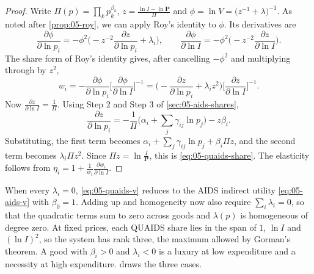 \begin{proof}
Write $\Pi(p) = \prod_kp_k^{\beta_k}$, $z = \frac{\ln I - \ln\mathbf{P}}{\Pi}$ and $\phi = \ln V =
\big(z^{-1} + \lambda\big)^{-1}$. As noted after \cref{prop:05-roy}, we can apply Roy's identity to
$\phi$. Its derivatives are
\begin{equation*}
\frac{\partial\phi}{\partial\ln p_i} = -\phi^2\Big(-z^{-2}\frac{\partial z}{\partial\ln p_i} + \lambda_i\Big),
\qquad
\frac{\partial\phi}{\partial\ln I} = -\phi^2\Big(-z^{-2}\frac{\partial z}{\partial\ln I}\Big).
\end{equation*}
The share form of Roy's identity gives, after cancelling $-\phi^2$ and multiplying through by $z^2$,
\begin{equation*}
w_i = -\frac{\partial\phi}{\partial\ln p_i}\Big[\frac{\partial\phi}{\partial\ln I}\Big]^{-1}
= \Big(-\frac{\partial z}{\partial\ln p_i} + \lambda_iz^2\Big)\Big[\frac{\partial z}{\partial\ln I}\Big]^{-1} .
\end{equation*}
Now $\frac{\partial z}{\partial\ln I} = \frac{1}{\Pi}$. Using Step 2 and Step 3 of \cref{sec:05-aids-shares},
\begin{equation*}
\frac{\partial z}{\partial\ln p_i} = -\frac{1}{\Pi}\Big(\alpha_i + \sum_j\gamma_{ij}\ln p_j\Big) - z\beta_i .
\end{equation*}
Substituting, the first term becomes $\alpha_i + \sum_j\gamma_{ij}\ln p_j + \beta_i\Pi z$, and the second term
becomes $\lambda_i\Pi z^2$. Since $\Pi z = \ln\frac{I}{\mathbf{P}}$, this is \eqref{eq:05-quaids-share}. The
elasticity follows from $\eta_i = 1 + \frac{1}{w_i}\frac{\partial w_i}{\partial\ln I}$.
\end{proof}

When every $\lambda_i = 0$, \eqref{eq:05-quaids-v} reduces to the AIDS indirect utility \eqref{eq:05-aids-v}
with $\beta_0 = 1$. Adding up and homogeneity now also require $\sum_i\lambda_i = 0$, so that the quadratic
terms sum to zero across goods and $\lambda(p)$ is homogeneous of degree zero. At fixed prices, each QUAIDS
share lies in the span of $1$, $\ln I$ and $(\ln I)^2$, so the system has rank three, the maximum allowed by
Gorman's theorem. A good with $\beta_i > 0$ and $\lambda_i < 0$ is a luxury at low expenditure and a
necessity at high expenditure.  draws the three cases.

